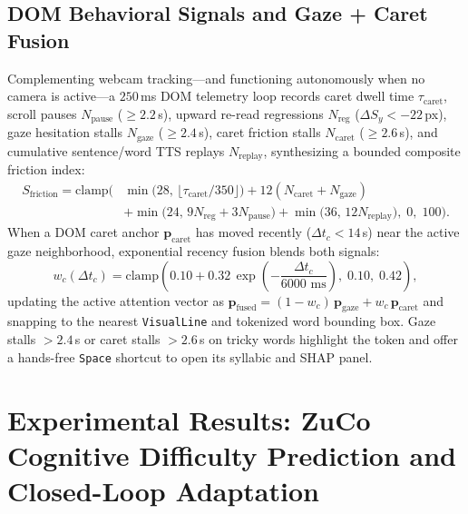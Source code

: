 \documentclass[conference]{IEEEtran}
\begin{document}
\subsection{DOM Behavioral Signals and Gaze + Caret Fusion}
Complementing webcam tracking---and functioning autonomously when no camera is active---a $250$\,ms DOM telemetry loop records caret dwell time $\tau_{\text{caret}}$, scroll pauses $N_{\text{pause}}$ ($\ge 2.2$\,s), upward re-read regressions $N_{\text{reg}}$ ($\Delta S_y < -22$\,px), gaze hesitation stalls $N_{\text{gaze}}$ ($\ge 2.4$\,s), caret friction stalls $N_{\text{caret}}$ ($\ge 2.6$\,s), and cumulative sentence/word TTS replays $N_{\text{replay}}$, synthesizing a bounded composite friction index:
\begin{align}
    S_{\text{friction}} = \text{clamp}\Big(&\min\!\big(28,\,\lfloor\tau_{\text{caret}}/350\rfloor\big) + 12(N_{\text{caret}} + N_{\text{gaze}}) \nonumber\\
    &+ \min\!\big(24,\, 9 N_{\text{reg}} + 3 N_{\text{pause}}\big) + \min\!\big(36,\, 12 N_{\text{replay}}\big),\; 0,\; 100\Big).
\end{align}
When a DOM caret anchor $\mathbf{p}_{\text{caret}}$ has moved recently ($\Delta t_c < 14$\,s) near the active gaze neighborhood, exponential recency fusion blends both signals:
\begin{equation}
    w_c(\Delta t_c) = \text{clamp}\!\left(0.10 + 0.32\,\exp\!\left(-\frac{\Delta t_c}{6000\text{ ms}}\right),\; 0.10,\; 0.42\right),
\end{equation}
updating the active attention vector as $\mathbf{p}_{\text{fused}} = (1 - w_c)\,\mathbf{p}_{\text{gaze}} + w_c\,\mathbf{p}_{\text{caret}}$ and snapping to the nearest \texttt{VisualLine} and tokenized word bounding box. Gaze stalls $>2.4$\,s or caret stalls $>2.6$\,s on tricky words highlight the token and offer a hands-free \texttt{Space} shortcut to open its syllabic and SHAP panel.

\section{Experimental Results: ZuCo Cognitive Difficulty Prediction and Closed-Loop Adaptation}
\end{document}

